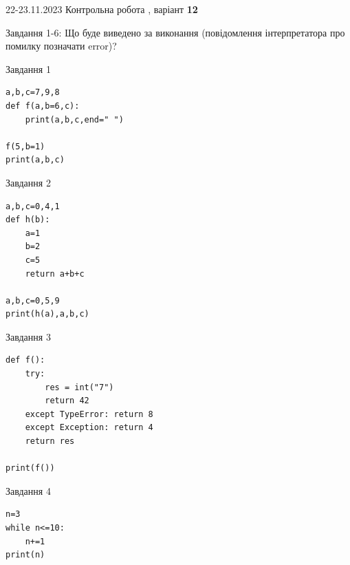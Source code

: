 \documentclass[12pt, ukrainian]{article}
\begin{document}
{{22-23.11.2023 Контрольна робота , варіант  \No \textbf { 12 }\par}}
{

Завдання 1-6: Що буде виведено за виконання (повідомлення інтерпретатора про помилку позначати error)?


\begin{minipage}[t]{9.7cm}                
{\begin{center}Завдання {1}\end{center}}
\begin{verbatim}
a,b,c=7,9,8
def f(a,b=6,c):
    print(a,b,c,end=" ")

f(5,b=1)
print(a,b,c)
\end{verbatim}     
\end{minipage}
\vline \hspace{8mm}
\begin{minipage}[t]{8.0cm}                
{\begin{center}Завдання {2}\end{center}}
\begin{verbatim}
a,b,c=0,4,1
def h(b):
    a=1
    b=2
    c=5
    return a+b+c

a,b,c=0,5,9
print(h(a),a,b,c)
\end{verbatim}     
\end{minipage}

\vspace{15mm}
\begin{minipage}[t]{9.7cm}                
{\begin{center}Завдання {3}\end{center}}
\begin{verbatim}
def f():
    try:
        res = int("7")
        return 42
    except TypeError: return 8
    except Exception: return 4
    return res

print(f())
\end{verbatim}     
\end{minipage}
\vline \hspace{8mm}
\begin{minipage}[t]{8.0cm}                
{\begin{center}Завдання {4}\end{center}}
\begin{verbatim}
n=3
while n<=10:
    n+=1
print(n)
\end{verbatim}     
\end{minipage}

}
\end{document}
